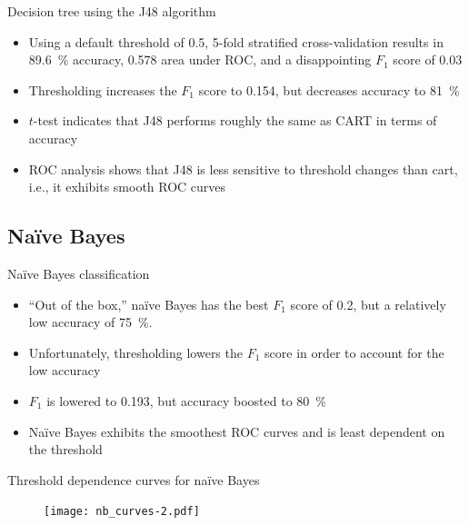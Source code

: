 \documentclass[serif, hyperref={unicode}, xcolor={x11names, psnames, dvipsnames,
  table}, usepdftitle=false]{beamer}
\begin{document}
\begin{frame}{Decision tree using the J48 algorithm}
  \begin{itemize}
  \item Using a default threshold of \num{0.5}, 5-fold stratified
    cross-validation results in \SI{89.6}{\percent} accuracy, \num{0.578} area
    under ROC, and a disappointing $F_1$ score of \num{0.03}
  \item Thresholding increases the $F_1$ score to \num{0.154}, but
    decreases accuracy to \SI{81}{\percent}
  \item $t$-test indicates that J48 performs roughly the same as CART in terms
    of accuracy
  \item ROC analysis shows that J48 is less sensitive to threshold changes than
    cart, i.e., it exhibits smooth ROC curves
  \end{itemize}
\end{frame}

\subsection{Na\"i{}ve Bayes}
\begin{frame}{Na\"i{}ve Bayes classification}
  \begin{itemize}
  \item ``Out of the box,'' na\"i{}ve Bayes has the best $F_1$ score of
    \num{0.2}, but a relatively low accuracy of \SI{75}{\percent}.
  \item Unfortunately, thresholding lowers the $F_1$ score in order to account
    for the low accuracy
  \item $F_1$ is lowered to \num{0.193}, but accuracy boosted to
    \SI{80}{\percent}
  \item Na\"i{}ve Bayes exhibits the smoothest ROC curves and is least dependent
    on the threshold
  \end{itemize}
\end{frame}

\begin{frame}{Threshold dependence curves for na\"i{}ve Bayes}
  \begin{figure}[!h]
    \texttt{[image: nb\_curves-2.pdf]}
  \end{figure}
\end{frame}
\end{document}

